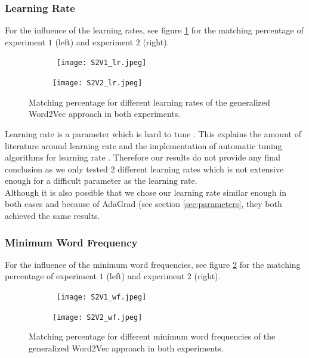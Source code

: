 \subsubsection{Learning Rate}

For the influence of the learning rates, see figure \ref{fig:s2v_lr} for the matching percentage of experiment $1$ (left) and experiment $2$ (right). \\

\begin{figure}[!htb]
	\centering
	\begin{subfigure}[b]{.49\textwidth}\
		\texttt{[image: S2V1\_lr.jpeg]}
	\end{subfigure}
	\begin{subfigure}[b]{.49\textwidth}
		\texttt{[image: S2V2\_lr.jpeg]}
	\end{subfigure}
	\caption{Matching percentage for different learning rates of the generalized Word2Vec 		approach in both experiments.}
	\label{fig:s2v_lr}
\end{figure}

Learning rate is a parameter which is hard to tune \cite{peskyLr:article}. This explains the amount of literature around learning rate and the implementation of automatic tuning algorithms for learning rate \cite{peskyLr:article} \cite{adagrad:article} \cite{lrHard:article}. Therefore our results do not provide any final conclusion as we only tested $2$ different learning rates which is not extensive enough for a difficult parameter as the learning rate. \\
Although it is also possible that we chose our learning rate similar enough in both cases and because of AdaGrad (see section \ref{sec:parameters}, they both achieved the same results.

\subsubsection{Minimum Word Frequency}

For the influence of the minimum word frequencies, see figure \ref{fig:s2v_wf} for the matching percentage of experiment $1$ (left) and experiment $2$ (right). \\

\begin{figure}[!htb]
	\centering
	\begin{subfigure}[b]{.49\textwidth}\
		\texttt{[image: S2V1\_wf.jpeg]}
	\end{subfigure}
	\begin{subfigure}[b]{.49\textwidth}
		\texttt{[image: S2V2\_wf.jpeg]}
	\end{subfigure}
	\caption{Matching percentage for different minimum word frequencies of the generalized Word2Vec approach in both experiments.}
	\label{fig:s2v_wf}
\end{figure}

